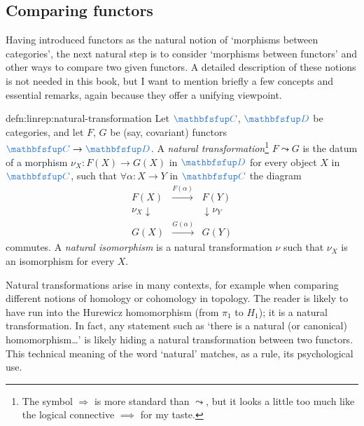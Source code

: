 \subsection{Comparing functors}%
\label{subsec:linrep:comparing-functors}
Having introduced functors as the natural notion of `morphisms between
categories', the next natural step is to consider `morphisms between
functors' and other ways to compare two given functors. A detailed
description of these notions is not needed in this book, but I want to
mention briefly a few concepts and essential remarks, again because
they offer a unifying viewpoint.
\begin{defn}{}{defn:linrep:natural-transformation}
  Let $\categ{C}$, $\categ{D}$ be categories, and let $F$, $G$ be
  (say, covariant) functors $\categ{C} \to \categ{D}$. A \emph{natural
    transformation}\footnote{The symbol $\Rightarrow$ is more standard
    than $\leadsto$, but it looks a little too much like the logical
    connective $\implies$ for my taste.} $F \leadsto G$ is the datum
  of a morphism $\nu_X : F(X) \to G(X)$ in $\categ{D}$ for every
  object $X$ in $\categ{C}$, such that $\forall \alpha : X \to Y$ in
  $\categ{C}$ the diagram
  \[
    \begin{array}{ccc}
      F(X) & \xrightarrow{F(\alpha)} & F(Y) \\
      \nu_X \downarrow & & \downarrow \nu_Y \\
      G(X) & \xrightarrow{G(\alpha)} & G(Y)
    \end{array}
  \]
  commutes. A \emph{natural isomorphism} is a natural transformation
  $\nu$ such that $\nu_X$ is an isomorphism for every $X$.
\end{defn}
Natural transformations arise in many contexts, for example when
comparing different notions of homology or cohomology in topology. The
reader is likely to have run into the Hurewicz homomorphism (from
$\pi_1$ to $H_1$); it is a natural transformation. In fact, any
statement such as `there is a natural (or canonical)
homomorphism\dots' is likely hiding a natural transformation between
two functors. This technical meaning of the word `natural' matches, as
a rule, its psychological use.

